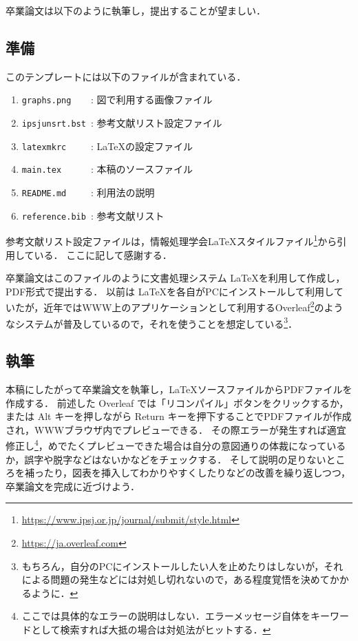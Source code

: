 \documentclass[a4paper,twocolumn,10pt]{jsarticle}
\begin{document}
卒業論文は以下のように執筆し，提出することが望ましい．

\subsection{準備}

このテンプレートには以下のファイルが含まれている．
\begin{enumerate}
 \item \verb|graphs.png    |: 図で利用する画像ファイル
 \item \verb|ipsjunsrt.bst |: 参考文献リスト設定ファイル
 \item \verb|latexmkrc     |: \LaTeX の設定ファイル
 \item \verb|main.tex      |: 本稿のソースファイル
 \item \verb|README.md     |: 利用法の説明
 \item \verb|reference.bib |: 参考文献リスト
\end{enumerate}
参考文献リスト設定ファイルは，情報処理学会\LaTeX スタイルファイル\footnote{\url{https://www.ipsj.or.jp/journal/submit/style.html}}から引用している．
ここに記して感謝する．

卒業論文はこのファイルのように文書処理システム \LaTeX を利用して作成し，PDF形式で提出する．
以前は \LaTeX を各自がPCにインストールして利用していたが，近年ではWWW上のアプリケーションとして利用するOverleaf\footnote{\url{https://ja.overleaf.com}}のようなシステムが普及しているので，それを使うことを想定している\footnote{もちろん，自分のPCにインストールしたい人を止めたりはしないが，それによる問題の発生などには対処し切れないので，ある程度覚悟を決めてかかるように．}．

\subsection{執筆}

本稿にしたがって卒業論文を執筆し，\LaTeX ソースファイルからPDFファイルを作成する．
前述した Overleaf では「リコンパイル」ボタンをクリックするか，または Alt キーを押しながら Return キーを押下することでPDFファイルが作成され，WWWブラウザ内でプレビューできる．
その際エラーが発生すれば適宜修正し\footnote{ここでは具体的なエラーの説明はしない．エラーメッセージ自体をキーワードとして検索すれば大抵の場合は対処法がヒットする．}，めでたくプレビューできた場合は自分の意図通りの体裁になっているか，誤字や脱字などはないかなどをチェックする．
そして説明の足りないところを補ったり，図表を挿入してわかりやすくしたりなどの改善を繰り返しつつ，卒業論文を完成に近づけよう．
\end{document}
